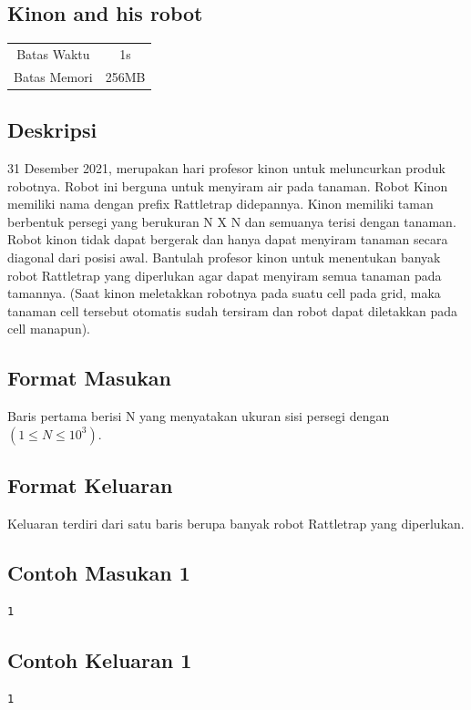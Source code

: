 \documentclass{article}
\begin{document}
\begin{center}
    \section*{Kinon and his robot} %

    \begin{tabular}{ | c c | }
        \hline
        Batas Waktu  & 1s \\    %
        Batas Memori & 256MB \\  %
        \hline
    \end{tabular}
\end{center}

\subsection*{Deskripsi}
31 Desember 2021, merupakan hari profesor kinon untuk meluncurkan produk robotnya. Robot ini berguna untuk menyiram air pada tanaman. Robot Kinon memiliki nama dengan prefix Rattletrap didepannya. Kinon memiliki taman berbentuk persegi yang berukuran N X N dan semuanya terisi dengan tanaman. Robot kinon tidak dapat bergerak dan hanya dapat menyiram tanaman secara diagonal  dari posisi awal. Bantulah profesor kinon untuk menentukan banyak robot Rattletrap yang diperlukan agar dapat menyiram semua tanaman pada tamannya. (Saat kinon meletakkan robotnya pada suatu cell pada grid, maka tanaman cell tersebut otomatis sudah tersiram dan robot dapat diletakkan pada cell manapun).

\subsection*{Format Masukan}

Baris pertama berisi N yang menyatakan ukuran sisi persegi dengan $(1 \leq N  \leq 10^3)$. 


\subsection*{Format Keluaran}
Keluaran terdiri dari satu baris berupa banyak robot Rattletrap yang diperlukan.

\begin{multicols}{2}
\subsection*{Contoh Masukan 1}
\begin{lstlisting}
1
\end{lstlisting}
\null
\columnbreak
\subsection*{Contoh Keluaran 1}
\begin{lstlisting}
1
\end{lstlisting}
\vfill
\null
\end{multicols}
\end{document}

